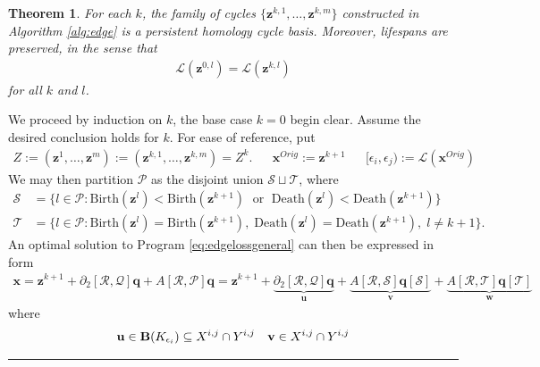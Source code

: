 \documentclass[11pt,onecolumn]{article}
\newtheorem{theorem}{Theorem}[section] %
\newenvironment{proof}{{\em Proof:}}{\hfill{\hfill\rule{2mm}{2mm}}}
\newcommand{\q}[0]{\mathbf{q}}
\newcommand{\Boundaries}[0]{\mathbf{B}}
\newcommand{\originalrep}{\mathbf{x}^{Orig}}
\newcommand{\optimalrep}{\mathbf{x}}
\newcommand{\cycle}{{\mathbf z}}
\newcommand{\cycleu}{\mathbf{u}}
\newcommand{\cyclev}{\mathbf{v}}
\newcommand{\cyclew}{\mathbf{w}}
\newcommand{\birth}{\mathrm{Birth}}
\newcommand{\death}{\mathrm{Death}}
\newcommand{\persinterval}{\mathcal{L}}
\newcommand{\goodcycleindices}{\mathcal P}
\newcommand{\goodtriangles}{\mathcal Q}
\newcommand{\goodedges}{\mathcal R}
\newcommand{\obasis}{Z} %
\newcommand{\obasisel}{\mathbf{z}}  %
\theoremstyle{plain}
\theoremstyle{definition}
\begin{document}
\newcommand{\vanishset}{\mathcal{S}}
\newcommand{\orderset}{\mathcal{T}}

\begin{theorem}
For each $k$, the family of cycles $\{\obasisel^{k,1}, \ldots, \obasisel^{k,m}\}$ constructed in Algorithm \ref{alg:edge} is a persistent homology cycle basis.  Moreover, lifespans are preserved, in the sense that
    \begin{align}
        \persinterval(\obasisel^{0,l}) = \persinterval(\obasisel^{k,l})
        \label{eq:samelifespan}
    \end{align}
for all $k$ and $l$.
\end{theorem}
\begin{proof}
We proceed by induction on $k$, the base case $k = 0$ begin clear.  Assume the desired conclusion holds for $k$.   For ease of reference, put
    \begin{align*}
        \obasis := (\obasisel^1, \ldots, \obasisel^m) := (\obasisel^{k,1}, \ldots, \obasisel^{k,m}) = \obasis^{k}.
        &&
        \originalrep := \obasisel^{k+1}
        &&
        [\epsilon_i, \epsilon_j) := \persinterval(\originalrep)
    \end{align*}
We may then partition $\goodcycleindices$ as the disjoint union $\vanishset \sqcup \orderset$, where 
    \begin{align*}
        \vanishset &= \{l \in \goodcycleindices : \birth(\cycle^l) < \birth(\cycle^{k+1})\; \text{ or } \; \death(\cycle^l) < \death(\cycle^{k+1}) \} \\
        \orderset &= \{l \in \goodcycleindices :  \birth(\cycle^l) = \birth(\cycle^{k+1}), \; \death(\cycle^l) = \death(\cycle^{k+1}), \; l \neq k+1 \}.
    \end{align*}
An optimal solution to Program \eqref{eq:edgelossgeneral} can then be expressed in  form 
    \begin{align*}
        \optimalrep 
        = 
        \obasisel^{k+1} + \partial_2[\goodedges, \goodtriangles] \q + A[\goodedges, \goodcycleindices] \q 
        = 
            \obasisel^{k+1}
            +
            \underbrace{\partial_2[\goodedges, \goodtriangles] \q}_{\cycleu}
            +
            \underbrace{A[\goodedges, \vanishset] \q[\vanishset]}_{\cyclev}
            +
            \underbrace{A[\goodedges, \orderset] \q[\orderset]}_{\cyclew}
    \end{align*}
where 
    \begin{align*}
        \cycleu \in \Boundaries(K_{\epsilon_i}) \subseteq \xij \cap \yij 
        &&
        \cyclev \in \xij \cap \yij

\end{align*}
\end{proof}
\end{document}
